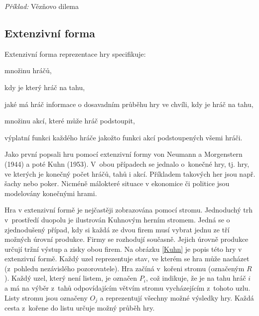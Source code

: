 \documentclass[12pt,a5paper]{article}
\begin{document}
\emph{Příklad:} Vězňovo dilema

\subsection{Extenzivní forma}
Extenzivní forma reprezentace hry specifikuje:
\begin{compactitem}
\item množinu hráčů,
\item kdy je který hráč na tahu,
\item jaké má hráč informace o dosavadním průběhu hry ve chvíli, kdy je hráč na tahu,
\item množinu akcí, které může hráč podstoupit,
\item výplatní funkci každého hráče jakožto funkci akcí podstoupených všemi hráči. 
\end{compactitem}

Jako první popsali hru pomocí extenzivní formy von Neumann a Morgenstern (1944) a poté Kuhn (1953). V~obou případech se jednalo o~konečné hry, tj. hry, ve kterých je konečný počet hráčů, tahů i akcí. Příkladem takových her jsou např. šachy nebo poker. Nicméně málokteré situace v ekonomice či politice jsou modelovány konečnými hrami. 

Hra v extenzivní formě je nejčastěji zobrazována pomocí stromu. Jednoduchý trh v~prostředí duopolu je ilustrován Kuhnovým herním stromem. Jedná se o zjednodušený případ, kdy si každá ze dvou firem musí vybrat jednu ze tří možných úrovní produkce. Firmy se rozhodují současně. Jejich úrovně produkce určují tržní výstup a zisky obou firem. Na obrázku \ref{Kuhn} je popis této hry v extenzivní formě. Každý uzel reprezentuje stav, ve kterém se hra může nacházet (z~pohledu nezávislého pozorovatele). Hra začíná v~kořeni stromu (označeným $R$). Každý uzel, který není listem, je označen $P_i$, což indikuje, že je na tahu hráč $i$ a má na výběr z~tahů odpovídajícím větvím stromu vycházejícím z~tohoto uzlu. Listy stromu jsou označeny $O_j$ a reprezentují všechny možné výsledky hry. Každá cesta z~kořene do listu určuje možný průběh hry.
\end{document}
